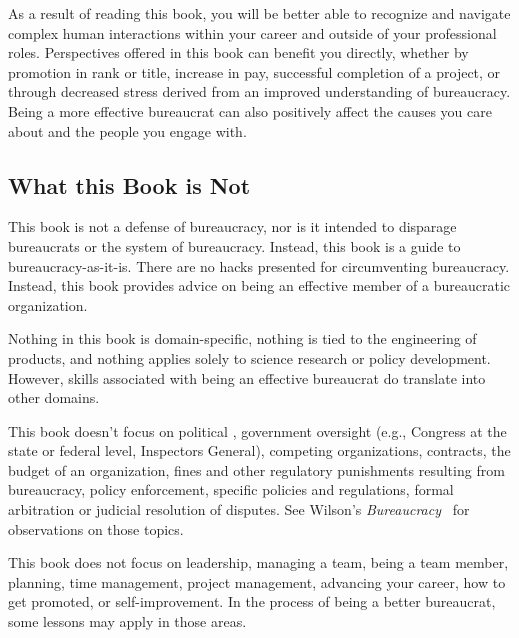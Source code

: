 
As a result of reading this book, you will be better able to recognize and navigate complex human interactions within your career and outside of your professional roles. Perspectives offered in this book can benefit you directly, whether by promotion in rank or title, increase in pay, successful completion of a project, or through decreased stress derived from an improved understanding of  bureaucracy. Being a more effective bureaucrat can also positively affect the causes you care about and the people you engage with.


\subsection*{What this Book is Not}

This book is not a defense of bureaucracy, nor is it intended to disparage bureaucrats or the system of bureaucracy. Instead, this book is a guide to bureaucracy-as-it-is. There are no hacks presented for circumventing bureaucracy. Instead, this book provides advice on being an effective member of a bureaucratic organization.

Nothing in this book is domain-specific, nothing is tied to the engineering of products, and nothing applies solely to science research or policy development. However, skills associated with being an effective bureaucrat do translate into other domains.

This book doesn't focus on political 
\iftoggle{glossarysubstitutionworks}{\glspl{policymaker}}{policymakers}, government oversight (e.g., Congress at the state or federal level, Inspectors General), 
competing organizations, contracts, the budget of an organization, fines and other regulatory punishments resulting from bureaucracy, policy enforcement, specific policies and regulations, formal arbitration or judicial resolution of disputes. See Wilson's \textit{Bureaucracy}~\cite{1991_Wilson} for observations on those topics. 


This book does not focus on leadership, managing a team, being a team member, planning, time management, project management, advancing your career, how to get promoted, or self-improvement. In the process of being a better bureaucrat, some lessons may apply in those areas.



